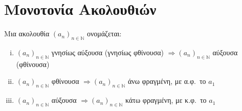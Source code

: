 \documentclass[a4paper,table]{report}
\begin{document}
\section{Μονοτονία Ακολουθιών}

\begin{mybox1}
  \begin{dfn}
    Μια ακολουθία $ (a_{n})_{n \in \mathbb{N}} $ ονομάζεται:
    \begin{enumerate}[i)]
  \end{enumerate}
\end{dfn}
\end{mybox1}

\begin{rems}
\item {}
  \begin{enumerate}[i)]
    \item $ (a_{n})_{n \in \mathbb{N}} $ γνησίως αύξουσα (γνησίως φθίνουσα) $ 
      \Rightarrow (a_{n})_{n \in \mathbb{N}} $ αύξουσα (φθίνουσα) 
    \item $ (a_{n})_{n \in \mathbb{N}} $ φθίνουσα  $ 
      \Rightarrow (a_{n})_{n \in \mathbb{N}} $ άνω φραγμένη, με 
      α.φ.\ το $ a_{1} $  
    \item $ (a_{n})_{n \in \mathbb{N}} $ αύξουσα  $ 
      \Rightarrow (a_{n})_{n \in \mathbb{N}} $ κάτω φραγμένη, με 
      κ.φ.\ το $ a_{1} $  
  \end{enumerate}
\end{rems}
\end{document}
